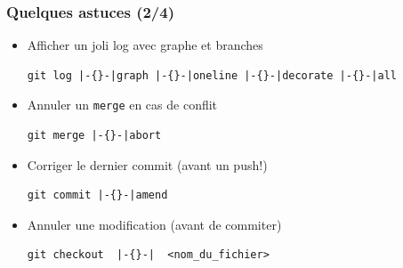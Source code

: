 \documentclass[table,tikz,12pt,svgnames]{beamer}
\begin{document}
\begin{frame}[fragile]
\frametitle{Quelques astuces (2/4)}
\vspace{-1em}
\begin{block}{}

\begin{itemize}
\item Afficher un joli log avec graphe et branches
\begin{adjustwidth}{0em}{0cm}
\begin{verbatim}
git log |-{}-|graph |-{}-|oneline |-{}-|decorate |-{}-|all
\end{verbatim}
\end{adjustwidth}
\item Annuler un \texttt{merge} en cas de conflit
\begin{adjustwidth}{0em}{0cm}
\begin{verbatim}
git merge |-{}-|abort
\end{verbatim}
\end{adjustwidth}

\item Corriger le dernier commit (avant un push!)
\begin{adjustwidth}{0em}{0cm}
\begin{verbatim}
git commit |-{}-|amend
\end{verbatim}
\end{adjustwidth}

\item Annuler une modification (avant de commiter)
\begin{adjustwidth}{0em}{0cm}
\begin{verbatim}
git checkout  |-{}-|  <nom_du_fichier>
\end{verbatim}
\end{adjustwidth}


\end{itemize}
\end{block}
\end{frame}
\end{document}
